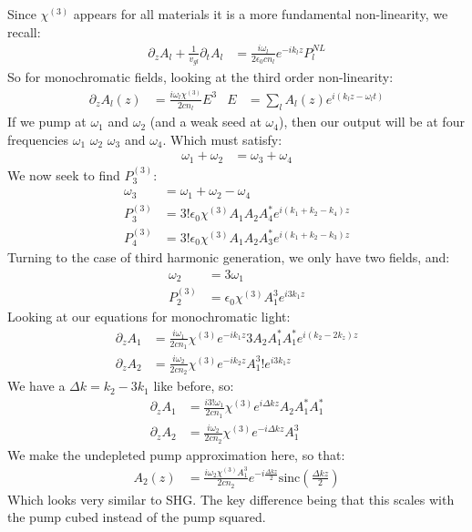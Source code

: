 Since $\chi^{(3)}$ appears for all materials it is a more fundamental non-linearity, we recall:
\begin{align*}
	\partial_z A_l + \frac{1}{v_{gl}} \partial_t A_l &= \frac{i\omega_l}{2\epsilon_0 cn_l} e^{-ik_l z} P_l^{NL}
\end{align*}
So for monochromatic fields, looking at the third order non-linearity:
\begin{align*}
	\partial_z A_l(z) &= \frac{i\omega_l \chi^{(3)}}{2cn_l} E^3 & E &= \sum_l A_l(z) e^{i(k_l z - \omega_l t)}
\end{align*}
If we pump at $\omega_1$ and $\omega_2$ (and a weak seed at $\omega_4$), then our output will be at four frequencies $\omega_1$ $\omega_2$ $\omega_3$ and $\omega_4$. Which must satisfy:
\begin{align*}
	\omega_1 + \omega_2 &= \omega_3 + \omega_4
\end{align*}
We now seek to find $P^{(3)}_3$:
\begin{align*}
	\omega_3 &= \omega_1 + \omega_2 - \omega_4 \\
	P_3^{(3)} &= 3!\epsilon_0 \chi^{(3)} A_1 A_2 A_4^* e^{i(k_1 + k_2 - k_4)z} \\
	P_4^{(3)} &= 3!\epsilon_0 \chi^{(3)} A_1 A_2 A_3^* e^{i(k_1 + k_2 - k_3)z}
\end{align*}
Turning to the case of third harmonic generation, we only have two fields, and:
\begin{align*}
	\omega_2 &= 3\omega_1 \\
	P_2^{(3)} &= \epsilon_0\chi^{(3)} A_1^3 e^{i3k_1 z}
\end{align*}
Looking at our equations for monochromatic light:
\begin{align*}
	\partial_z A_1 &= \frac{i\omega_1}{2c n_1} \chi^{(3)} e^{-ik_1 z} 3A_2 A_1^* A_1^* e^{i(k_2-2k_z)z} \\
	\partial_z A_2 &= \frac{i\omega_2}{2c n_2} \chi^{(3)} e^{-ik_2 z} A_1^3!e^{i3k_1z} 
\end{align*}
We have a $\Delta k = k_2-3k_1$ like before, so:
\begin{align*}
	\partial_z A_1 &= \frac{i3!\omega_1}{2c n_1} \chi^{(3)} e^{i\Delta k z} A_2 A_1^* A_1^* \\
	\partial_z A_2 &= \frac{i\omega_2}{2c n_2} \chi^{(3)} e^{-i\Delta k z} A_1^3
\end{align*}
We make the undepleted pump approximation here, so that:
\begin{align*}
	A_2(z) &= \frac{i\omega_2 \chi^{(3)}A_1^3}{2cn_2}e^{-i\frac{\Delta k z}{2}} \text{sinc}\left(\frac{\Delta k z}{2}\right)
\end{align*}
Which looks very similar to SHG. The key difference being that this scales with the pump cubed instead of the pump squared.

